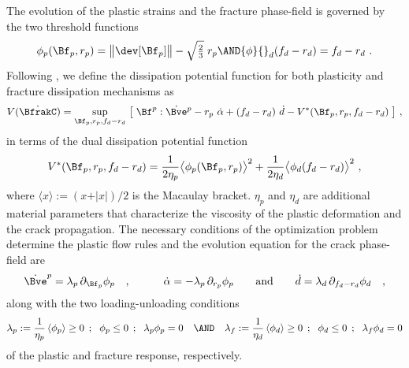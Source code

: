 \documentclass[final,3p,times]{elsarticle}
\begin{document}
The evolution of the plastic strains and the fracture phase-field is governed by the two threshold functions
%
\begin{equation}
{\phi}{}_p(\Bf_p, r_p) = \big\| \dev[\Bf_p] \big\| - \hbox{$\sqrt{\frac{2}{3}}$}\;  r_p
\AND
{\phi}{}_d(f_d - r_d) = f_d - r_d
\ .
\end{equation}
Following \cite{aldakheel16}, we define the dissipation potential function for both plasticity and fracture dissipation mechanisms as
%
\begin{equation}
{V} (\dot{\BfrakC}) = 
\sup_{\Bf_p, r_p, f_d - r_d} \,  
\big[\; \Bf^p : \dot{\Bve}{}^p - r_p~ \dot{\alpha} + (f_d-r_d)~ \dot{d} 
- {V}^{\ast} (\Bf_p, r_p, f_d - r_d)
\; \big]
\ ,
\end{equation}
%
in terms of the {dual dissipation potential function}
%
\begin{equation}
{V}^{\ast} (\Bf_p, r_p, f_d - r_d) = 
\frac{1}{2\eta_p} \big\langle {\phi}{}_p(\Bf_p, r_p) \big\rangle^2 +
\frac{1}{2\eta_d} \big\langle {\phi}{}_d(f_d - r_d) \big\rangle^2 \ ,
\end{equation}
%
where $\langle x \rangle := ( x + \vert x\vert )/2$ is the Macaulay bracket.
%
$\eta_p$ and $\eta_d$ are additional material parameters that characterize the viscosity of the plastic deformation and the crack propagation. The necessary conditions of the optimization problem determine the {plastic flow rules} and the evolution equation for the crack phase-field are
%
\begin{equation}
\dot\Bve^p = \lambda_p \, \partial_{\Bf_p} {\phi}{}_p \quad ,
\quad \qquad
\dot\alpha = - \lambda_p \, \partial_{r_p} {\phi}{}_p
\qquad \mbox{and} \qquad
\dot d = \lambda_d \, \partial_{f_d-r_d} {\phi}{}_d \quad ,
\end{equation}
along with the two loading-unloading conditions 
%
\begin{equation}
\lambda_p:= \frac{1}{\eta_p} \left\langle {\phi}{}_p \right\rangle \ge 0 \;\, ; \;\ {\phi}{}_p \le 0 \;\, ; \;\ \lambda_p {\phi}{}_p = 0
\quad \AND \quad
\lambda_f:= \frac{1}{\eta_d} \left\langle {\phi}{}_d \right\rangle \ge 0 \;\, ; \;\ {\phi}{}_d \le 0 \;\, ; \;\ \lambda_f {\phi}{}_d = 0
\end{equation}
of the plastic and fracture response, respectively. 
\end{document}

